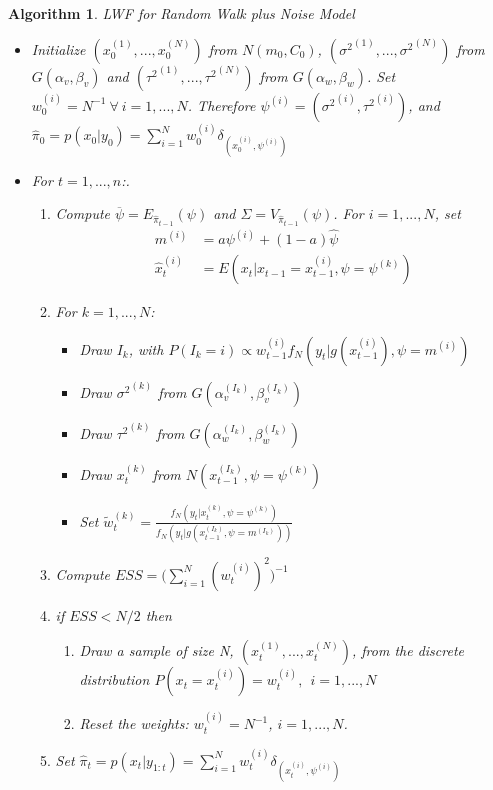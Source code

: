 \documentclass[
]{article}
\newtheorem{algorithm}{Algorithm}[section]
\begin{document}
\begin{algorithm} LWF for Random Walk plus Noise Model
\begin{itemize}
\item Initialize $(x_{0}^{(1)},...,x_{0}^{(N)})$ from $N(m_{0},C_{0})$, $({\sigma^{2}}^{(1)},...,{\sigma^{2}}^{(N)})$ from $G(\alpha_{v},\beta_{v})$ and $({\tau^{2}}^{(1)},...,{\tau^{2}}^{(N)})$ from $G(\alpha_{w},\beta_{w})$. Set $w_{0}^{(i)}=N^{-1} \ \forall \ i=1,...,N$. Therefore $\psi^{(i)}=({\sigma^{2}}^{(i)},{\tau^{2}}^{(i)})$, and
$\hat{\pi}_{0}=p(x_{0}|y_{0})=\sum_{i=1}^{N}w_{0}^{(i)}\delta_{(x_{0}^{(i)},\psi^{(i)})}$
\item For $t=1,...,n$:.
\begin{enumerate}
\item Compute $\overline{\psi}=E_{\hat{\pi}_{t-1}}(\psi)$ and $\Sigma=V_{\hat{\pi}_{t-1}}(\psi)$. For $i=1,...,N$, set
\begin{align*}
m^{(i)} & = a\psi^{(i)}+(1-a)\hat{\psi} \\
\hat{x}_{t}^{(i)} & = E(x_{t}|x_{t-1}=x_{t-1}^{(i)},\psi=\psi^{(k)})
\end{align*}
\item For $k=1,...,N$:
\begin{itemize}
\item Draw $I_{k}$, with $P(I_{k}=i) \propto w_{t-1}^{(i)}f_{N}(y_{t}|g(x_{t-1}^{(i)}),\psi=m^{(i)}) $
\item Draw ${\sigma^{2}}^{(k)}$ from $G(\alpha_{v}^{(I_k)},\beta_{v}^{(I_k)})$ 
\item Draw ${\tau^{2}}^{(k)}$ from $G(\alpha_{w}^{(I_k)},\beta_{w}^{(I_k)})$
\item Draw $x_{t}^{(k)}$ from $N(x_{t-1}^{(I_k)},\psi=\psi^{(k)})$
\item Set  $\tilde{w}_{t}^{(k)} = \frac{f_{N}(y_{t}|x_{t}^{(k)},\psi=\psi^{(k)})}{f_{N}(y_{t}|g(x_{t-1}^{(I_{k})},\psi=m^{(I_k)}))}$
\end{itemize}
\item Compute $ESS=\Bigg(\sum_{i=1}^{N}(w_{t}^{(i)})^{2}\Bigg)^{-1}$
\item if $ESS<N/2$ then
\begin{enumerate}
\item Draw a sample of size N, $(x_{t}^{(1)},...,x_{t}^{(N)})$, from the discrete distribution $P(x_{t}=x_{t}^{(i)})=w_{t}^{(i)},\ \ i=1,...,N$
\item Reset the weights: $w_{t}^{(i)}=N^{-1}$, $i=1,...,N$.
\end{enumerate}
\item Set $\hat{\pi}_{t}=p(x_{t}|y_{1:t})=\sum_{i=1}^{N}w_{t}^{(i)}\delta_{(x_{t}^{(i)},\psi^{(i)})}$
\end{enumerate}
\end{itemize}
\end{algorithm}
\end{document}
